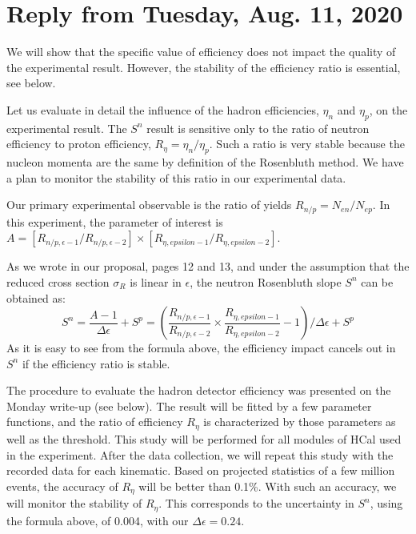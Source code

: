\documentclass[11pt]{article}
\begin{document}
\section*{Reply from Tuesday, Aug. 11, 2020}

We will show that the specific value of efficiency does not impact the quality of the experimental result.
However, the stability of the efficiency ratio is essential, see below.

Let us evaluate in detail the influence of the hadron efficiencies, $\eta_n$ and $\eta_p$, on the experimental result.
The $S^n$ result is sensitive only to the ratio of neutron efficiency to proton efficiency, $R_{\eta} = \eta_n/\eta_p$.
Such a ratio is very stable because the nucleon momenta are the same by definition of the Rosenbluth method.   
We have a plan to monitor the stability of this ratio in our experimental data.

Our primary experimental observable is the ratio of yields $R_{n/p} = N_{en}/N_{ep}$.
In this experiment, the parameter of interest is $A = [R_{n/p, \epsilon-1}/R_{n/p, \epsilon-2}]\times[R_{\eta, epsilon-1}/R_{\eta, epsilon-2}]$.

As we wrote in our proposal, pages 12 and 13, and under the assumption that the reduced cross section $\sigma_R$ is linear in $\epsilon$,
the neutron Rosenbluth slope $S^n$ can be obtained as:
%
\begin{equation}
  S^n = \frac{A-1}{\Delta\epsilon} + S^p = (\frac{R_{n/p, \epsilon-1}}{R_{n/p, \epsilon-2}}\times \frac{R_{\eta, epsilon-1}}{R_{\eta, epsilon-2}}-1)/\Delta\epsilon + S^p
  \label{eq:Sn}
\end{equation}
%
As it is easy to see from the formula above, the efficiency impact cancels out in $S^n$ if the efficiency ratio is stable.

The procedure to evaluate the hadron detector efficiency was presented on the Monday write-up (see below).
The result will be fitted by a few parameter functions, and the ratio of efficiency $R_{\eta}$ is characterized by those parameters as well as the threshold.
This study will be performed for all modules of HCal used in the experiment.
After the data collection, we will repeat this study with the recorded data for each kinematic.
Based on projected statistics of a few million events, the accuracy of $R_{\eta}$ will be better than 0.1\%.
With such an accuracy, we will monitor the stability of $R_{\eta}$.
This corresponds to the uncertainty in $S^n$, using the formula above, of 0.004, with our $\Delta \epsilon = 0.24$. 
\end{document}
